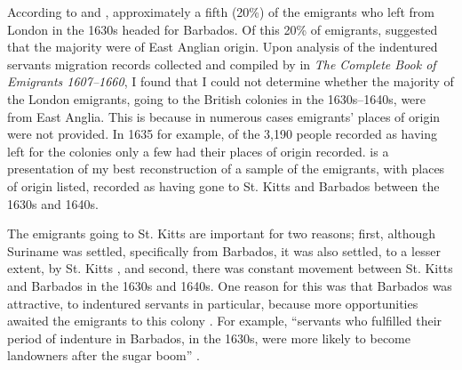 \label{6.2.1.1.1}
According to \citet{Menard06} and \citet{Parker11}, approximately a fifth (20\%) of the emigrants who left from London in the 1630s headed for Barbados. Of this 20\% of emigrants, \citet{Currer82} suggested that the majority were of East Anglian origin. Upon analysis of the indentured servants migration records collected and compiled by \citet{Coldham92} in \emph{The Complete Book of Emigrants 1607--1660}, I found that I could not determine whether the majority of the London emigrants, going to the British colonies in the 1630s--1640s, were from East Anglia. This is because in numerous cases emigrants' places of origin were not provided. In 1635 for example, of the 3,190 people recorded as having left for the colonies \citep{Menard06} only a few had their places of origin recorded.   is a presentation of my best reconstruction of a sample of the emigrants, with places of origin listed, recorded as having gone to St. Kitts and Barbados between the 1630s and 1640s.

The emigrants going to St. Kitts are important for two reasons; first, although Suriname was settled, specifically from Barbados, it was also settled, to a lesser extent, by St. Kitts \citep{Sainsbury60}, and second, there was constant movement between St. Kitts and Barbados in the 1630s and 1640s. One reason for this was that Barbados was attractive, to indentured servants in particular, because more opportunities awaited the emigrants to this colony \citep{Menard06}. For example, ``servants who fulfilled their period of indenture in Barbados, in the 1630s, were more likely to become landowners after the sugar boom'' \citep[25]{Menard06}.

